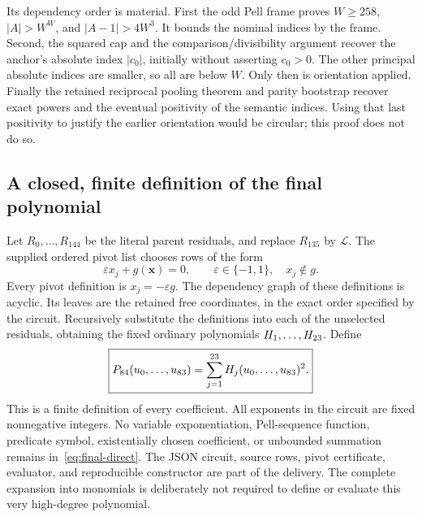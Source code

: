 \documentclass[11pt,letterpaper]{article}
\theoremstyle{definition}\newtheorem{definition}[theorem]{Definition}
\theoremstyle{remark}\newtheorem{remark}[theorem]{Remark}
\begin{document}
Its dependency order is material. First the odd Pell frame proves $W\ge258$, $|A|>W^W$, and $|A-1|>4W^3$. It bounds the nominal indices by the frame. Second, the squared cap and the comparison/divisibility argument recover the anchor's absolute index $|c_0|$, initially without asserting $c_0>0$. The other principal absolute indices are smaller, so all are below $W$. Only then is orientation applied. Finally the retained reciprocal pooling theorem and parity bootstrap recover exact powers and the eventual positivity of the semantic indices. Using that last positivity to justify the earlier orientation would be circular; this proof does not do so.

\subsection{A closed, finite definition of the final polynomial}
Let $R_0,\ldots,R_{144}$ be the literal parent residuals, and replace $R_{135}$ by $\mathcal L$. The supplied ordered pivot list chooses rows of the form
\begin{equation}\label{eq:unit-row}
\varepsilon x_j+g(\boldsymbol x)=0,\qquad \varepsilon\in\{-1,1\},
\quad x_j\notin g.
\end{equation}
Every pivot definition is $x_j=-\varepsilon g$. The dependency graph of these definitions is acyclic. Its leaves are the \DirectVars{} retained free coordinates, in the exact order specified by the circuit. Recursively substitute the definitions into each of the \DirectRows{} unselected residuals, obtaining the fixed ordinary polynomials $H_1,\ldots,H_{23}$. Define
\begin{equation}\label{eq:final-direct}
\boxed{P_{84}(u_0,\ldots,u_{83})
=\sum_{j=1}^{23}H_j(u_0,\ldots,u_{83})^2.}
\end{equation}
This is a finite definition of every coefficient. All exponents in the circuit are fixed nonnegative integers. No variable exponentiation, Pell-sequence function, predicate symbol, existentially chosen coefficient, or unbounded summation remains in~\eqref{eq:final-direct}. The JSON circuit, source rows, pivot certificate, evaluator, and reproducible constructor are part of the delivery. The complete expansion into monomials is deliberately not required to define or evaluate this very high-degree polynomial.
\end{document}

